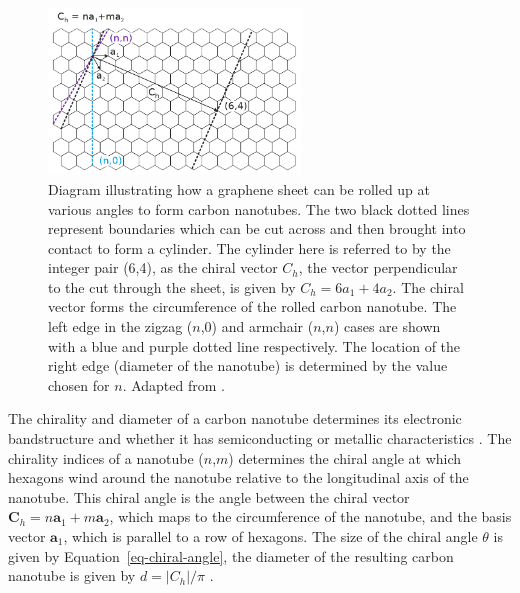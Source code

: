 \documentclass[
  a4paper,
]{scrbook}
\begin{document}
\begin{figure}

{\centering \includegraphics[width=0.6\textwidth,height=\textheight]{figures/ch2/carbon_nanotube_wrapping.png}

}

\caption{\label{fig-carbon-nanotube-wrapping}Diagram illustrating how a
graphene sheet can be rolled up at various angles to form carbon
nanotubes. The two black dotted lines represent boundaries which can be
cut across and then brought into contact to form a cylinder. The
cylinder here is referred to by the integer pair (6,4), as the chiral
vector \(C_h\), the vector perpendicular to the cut through the sheet,
is given by \(C_h = 6a_1+4a_2\). The chiral vector forms the
circumference of the rolled carbon nanotube. The left edge in the zigzag
(\(n\),0) and armchair (\(n\),\(n\)) cases are shown with a blue and
purple dotted line respectively. The location of the right edge
(diameter of the nanotube) is determined by the value chosen for \(n\).
Adapted from \autocite{Dekker1999,Lu2012}.}

\end{figure}

The chirality and diameter of a carbon nanotube determines its
electronic bandstructure and whether it has semiconducting or metallic
characteristics
\autocite{Martel1998,Dekker1999,McEuen2002,Avouris2007,Shkodra2021,Li2023}.
The chirality indices of a nanotube (\(n\),\(m\)) determines the chiral
angle at which hexagons wind around the nanotube relative to the
longitudinal axis of the nanotube. This chiral angle is the angle
between the chiral vector
\(\textbf{C}_h = n\textbf{a}_1+m\textbf{a}_2\), which maps to the
circumference of the nanotube, and the basis vector \(\textbf{a}_1\),
which is parallel to a row of hexagons. The size of the chiral angle
\(\theta\) is given by Equation~\ref{eq-chiral-angle}, the diameter of
the resulting carbon nanotube is given by \(d=|C_h|/\pi\)
\autocite{Lu2012}.
\end{document}
